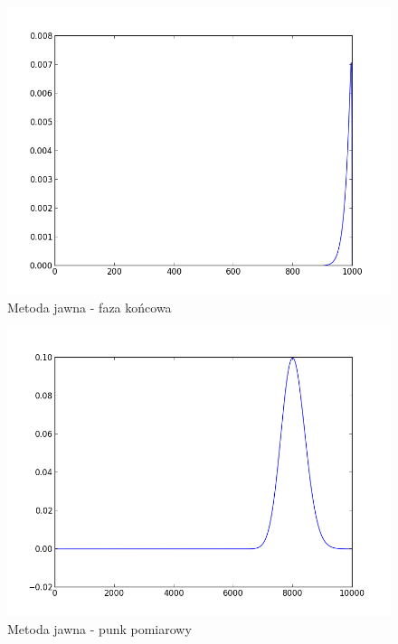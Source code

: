 \documentclass[a4paper,12pt]{article}
\begin{document}
	\begin{figure}
	\hspace{-100px}
	\includegraphics{plots1/00199}
	\caption{Metoda jawna - faza końcowa}
	\label{l4-3}
	\end{figure}
	\begin{figure}
	\hspace{-100px}
	\includegraphics{plots1/hist}
	\caption{Metoda jawna - punk pomiarowy}
	\label{l4-hist}
	\end{figure}
\end{document}
